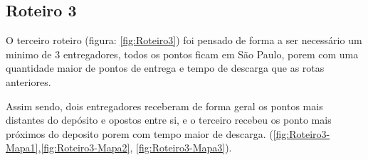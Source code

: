 \begin{center}
	\label{fig:Roteiro2-G1000P100-SwapMutation}
\end{center}


\subsection{Roteiro 3}

O terceiro roteiro (figura: \ref{fig:Roteiro3}) foi pensado de forma a ser necessário um minimo de 3 entregadores, todos os pontos ficam em São Paulo, porem com uma quantidade maior de pontos de entrega e tempo de descarga que as rotas anteriores.

Assim sendo, dois entregadores receberam de forma geral os pontos mais distantes do depósito e opostos entre si, e o terceiro  recebeu os ponto mais próximos do deposito   porem com tempo maior de descarga. (\ref{fig:Roteiro3-Mapa1},\ref{fig:Roteiro3-Mapa2}, \ref{fig:Roteiro3-Mapa3}).


